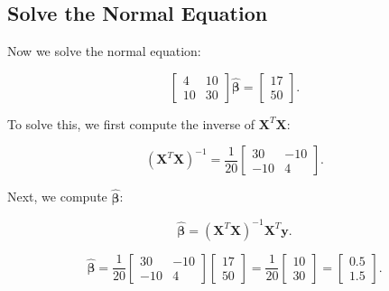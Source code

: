 \subsection{Solve the Normal Equation}

Now we solve the normal equation:

\begin{equation}
    \begin{bmatrix}
        4 & 10 \\
        10 & 30
    \end{bmatrix} \hat{\boldsymbol{\beta}} = \begin{bmatrix}
        17 \\
        50
    \end{bmatrix}.
\end{equation}

To solve this, we first compute the inverse of $\mathbf{X}^T \mathbf{X}$:

\begin{equation}
    (\mathbf{X}^T \mathbf{X})^{-1} = \frac{1}{20} \begin{bmatrix}
        30 & -10 \\
        -10 & 4
    \end{bmatrix}.
\end{equation}

Next, we compute $\hat{\boldsymbol{\beta}}$:

\begin{equation}
    \hat{\boldsymbol{\beta}} = (\mathbf{X}^T \mathbf{X})^{-1} \mathbf{X}^T \mathbf{y}.
\end{equation}

\begin{equation}
    \hat{\boldsymbol{\beta}} = \frac{1}{20} \begin{bmatrix}
        30 & -10 \\
        -10 & 4
    \end{bmatrix}
    \begin{bmatrix}
        17 \\
        50
    \end{bmatrix}
    = \frac{1}{20} \begin{bmatrix}
        10 \\
        30
    \end{bmatrix}
    = \begin{bmatrix}
        0.5 \\
        1.5
    \end{bmatrix}.
\end{equation}

